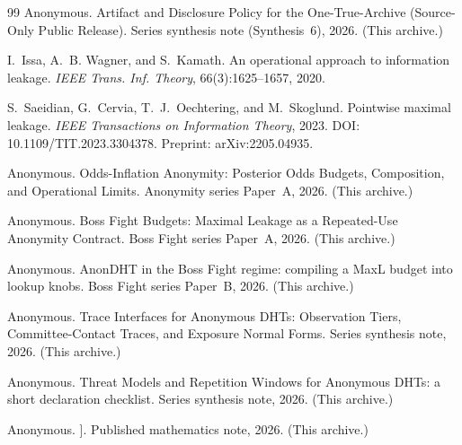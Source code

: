 \documentclass[11pt]{article}
\begin{document}
\begin{thebibliography}{99}\small
{}
Anonymous.
\newblock Artifact and Disclosure Policy for the One-True-Archive (Source-Only Public Release).
\newblock Series synthesis note (Synthesis~6), 2026. (This archive.)

I.~Issa, A.~B. Wagner, and S.~Kamath.
\newblock An operational approach to information leakage.
\newblock \emph{IEEE Trans. Inf. Theory}, 66(3):1625--1657, 2020.

S.~Saeidian, G.~Cervia, T.~J.~Oechtering, and M.~Skoglund.
\newblock Pointwise maximal leakage.
\newblock \emph{IEEE Transactions on Information Theory}, 2023.\; DOI: 10.1109/TIT.2023.3304378. Preprint: arXiv:2205.04935.

Anonymous.
\newblock Odds-Inflation Anonymity: Posterior Odds Budgets, Composition, and Operational Limits.
\newblock Anonymity series Paper~A, 2026. (This archive.)

Anonymous.
\newblock Boss Fight Budgets: Maximal Leakage as a Repeated-Use Anonymity Contract.
\newblock Boss Fight series Paper~A, 2026. (This archive.)

Anonymous.
\newblock AnonDHT in the Boss Fight regime: compiling a MaxL budget into lookup knobs.
\newblock Boss Fight series Paper~B, 2026. (This archive.)

Anonymous.
\newblock Trace Interfaces for Anonymous DHTs: Observation Tiers, Committee-Contact Traces, and Exposure Normal Forms.
\newblock Series synthesis note, 2026. (This archive.)

Anonymous.
\newblock Threat Models and Repetition Windows for Anonymous DHTs: a short declaration checklist.
\newblock Series synthesis note, 2026. (This archive.)

Anonymous.
\newblock [[2026.01.23 - Mathematics: Spectral Anonymity and Optimal Distinguishing Bounds for Random-Walk Delegation in (Possibly Directed) Overlays]].
\newblock Published mathematics note, 2026. (This archive.)

\end{thebibliography}
\end{document}
